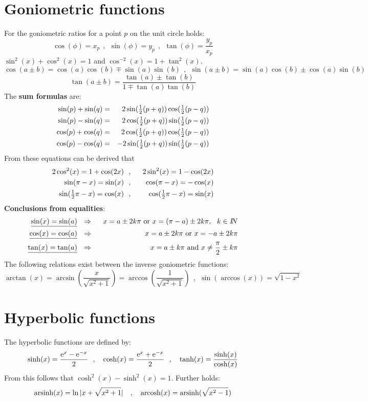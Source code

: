 \documentclass[twoside]{report}
\begin{document}
\section{Goniometric functions}
For the goniometric ratios for a point $p$ on the unit circle holds:
\[
\cos(\phi)=x_p~~,~~\sin(\phi)=y_p~~,~~\tan(\phi)=\frac{y_p}{x_p}
\]
$\sin^2(x)+\cos^2(x)=1$ and $\cos^{-2}(x)=1+\tan^2(x)$.
\[
\cos(a\pm b)=\cos(a)\cos(b)\mp\sin(a)\sin(b)~~,~~
\sin(a\pm b)=\sin(a)\cos(b)\pm\cos(a)\sin(b)
\]
\[
\tan(a\pm b)=\frac{\tan(a)\pm\tan(b)}{1\mp\tan(a)\tan(b)}
\]
The {\bf sum formulas} are:
\begin{eqnarray*}
\sin(p)+\sin(q)&=&2\sin(\mbox{$\frac{1}{2}$}(p+q))\cos(\mbox{$\frac{1}{2}$}(p-q))\\
\sin(p)-\sin(q)&=&2\cos(\mbox{$\frac{1}{2}$}(p+q))\sin(\mbox{$\frac{1}{2}$}(p-q))\\
\cos(p)+\cos(q)&=&2\cos(\mbox{$\frac{1}{2}$}(p+q))\cos(\mbox{$\frac{1}{2}$}(p-q))\\
\cos(p)-\cos(q)&=&-2\sin(\mbox{$\frac{1}{2}$}(p+q))\sin(\mbox{$\frac{1}{2}$}(p-q))\\
\end{eqnarray*}
From these equations can be derived that
\begin{eqnarray*}
2\cos^2(x)=1+\cos(2x)   &~~,~~&2\sin^2(x)=1-\cos(2x)\\
\sin(\pi-x)=\sin(x)     &~~,~~&\cos(\pi-x)=-\cos(x)\\
\sin(\mbox{$\frac{1}{2}$}\pi-x)=\cos(x)&~~,~~&\cos(\mbox{$\frac{1}{2}$}\pi-x)=\sin(x)
\end{eqnarray*}
{\bf Conclusions from equalities}:
\begin{eqnarray*}
\underline{\sin(x)=\sin(a)}&~~\Rightarrow~~&x=a\pm2k\pi\mbox{ or }x=(\pi-a)\pm2k\pi,~~k\in I\hspace{-1mm}N\\
\underline{\cos(x)=\cos(a)}&~~\Rightarrow~~&x=a\pm2k\pi\mbox{ or }x=-a\pm2k\pi\\
\underline{\tan(x)=\tan(a)}&~~\Rightarrow~~&x=a\pm k\pi\mbox{ and }x\neq\frac{\pi}{2}\pm k\pi
\end{eqnarray*}
The following relations exist between the inverse goniometric functions:
\[
\arctan(x)=\arcsin\left(\frac{x}{\sqrt{x^2+1}}\right)=\arccos\left(\frac{1}{\sqrt{x^2+1}}\right)~~,~~
\sin(\arccos(x))=\sqrt{1-x^2}
\]

\section{Hyperbolic functions}
The hyperbolic functions are defined by:
\[
\sinh(x)=\frac{{\rm e}^x-{\rm e}^{-x}}{2}~~,~~~\cosh(x)=\frac{{\rm e}^x+{\rm e}^{-x}}{2}~~,~~~\tanh(x)=\frac{\sinh(x)}{\cosh(x)}
\]
From this follows that $\cosh^2(x)-\sinh^2(x)=1$. Further holds:
\[
{\rm arsinh}(x)=\ln|x+\sqrt{x^2+1}|~~~,~~~{\rm arcosh}(x)={\rm arsinh}(\sqrt{x^2-1})
\]
\end{document}
